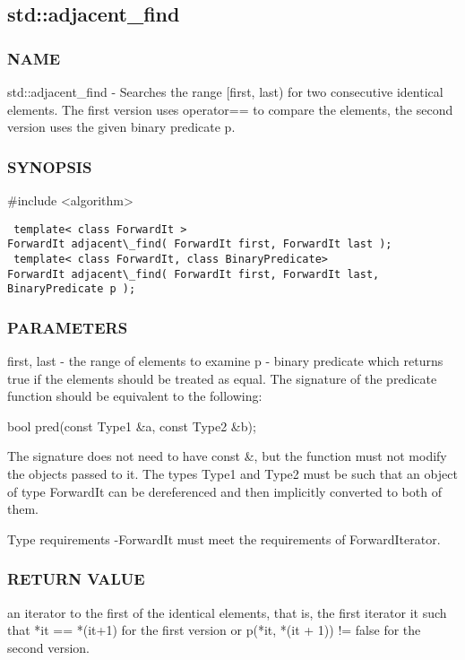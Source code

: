 \subsection{std::adjacent\_find}

\subsubsection{NAME}
std::adjacent\_find - Searches the range [first, last) for two consecutive identical elements. The first version uses operator== to compare the elements, the second version uses the given binary predicate p.

\subsubsection{SYNOPSIS}
\#include <algorithm>

\begin{lstlisting}
 template< class ForwardIt >
ForwardIt adjacent\_find( ForwardIt first, ForwardIt last );
 template< class ForwardIt, class BinaryPredicate>
ForwardIt adjacent\_find( ForwardIt first, ForwardIt last, BinaryPredicate p );
\end{lstlisting}

\subsubsection{PARAMETERS}
first, last - the range of elements to examine
p - binary predicate which returns true  if the elements should be treated as equal.
The signature of the predicate function should be equivalent to the following:

 bool pred(const Type1 \&a, const Type2 \&b);

The signature does not need to have const \&, but the function must not modify the objects passed to it.
The types Type1 and Type2 must be such that an object of type ForwardIt can be dereferenced and then implicitly converted to both of them.


 Type requirements
 -ForwardIt must meet the requirements of ForwardIterator.

\subsubsection{RETURN VALUE}
an iterator to the first of the identical elements, that is, the first iterator it such that *it == *(it+1) for the first version or p(*it, *(it + 1)) != false for the second version.

